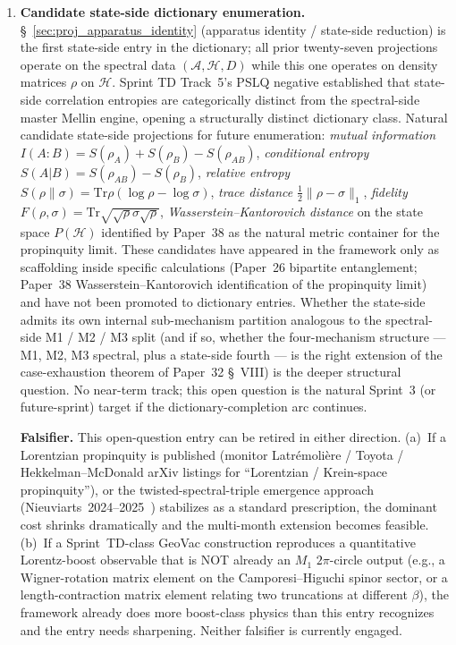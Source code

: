 \documentclass[11pt]{article}
\begin{document}
\begin{enumerate}
\item \textbf{Candidate state-side dictionary enumeration.}
\S~\ref{sec:proj_apparatus_identity} (apparatus identity / state-side
reduction) is the first state-side entry in the dictionary; all
prior twenty-seven projections operate on the spectral data
$(\mathcal{A}, \mathcal{H}, D)$ while this one operates on density
matrices $\rho$ on $\mathcal{H}$.  Sprint TD Track~5's PSLQ negative
established that state-side correlation entropies are categorically
distinct from the spectral-side master Mellin engine, opening a
structurally distinct dictionary class.  Natural candidate
state-side projections for future enumeration:
\emph{mutual information} $I(A{:}B) = S(\rho_A) + S(\rho_B) - S(\rho_{AB})$,
\emph{conditional entropy} $S(A|B) = S(\rho_{AB}) - S(\rho_B)$,
\emph{relative entropy} $S(\rho \| \sigma) = \mathrm{Tr}\rho(\log\rho
- \log\sigma)$,
\emph{trace distance} $\tfrac{1}{2}\|\rho - \sigma\|_1$,
\emph{fidelity} $F(\rho, \sigma) = \mathrm{Tr}\sqrt{\sqrt{\rho}\sigma\sqrt{\rho}}$,
\emph{Wasserstein--Kantorovich distance} on the state space
$P(\mathcal{H})$ identified by Paper~38 as the natural metric
container for the propinquity limit.  These candidates have appeared
in the framework only as scaffolding inside specific calculations
(Paper~26 bipartite entanglement; Paper~38 Wasserstein--Kantorovich
identification of the propinquity limit) and have not been promoted
to dictionary entries.  Whether the state-side admits its own
internal sub-mechanism partition analogous to the spectral-side M1 /
M2 / M3 split (and if so, whether the four-mechanism structure ---
M1, M2, M3 spectral, plus a state-side fourth --- is the right
extension of the case-exhaustion theorem of Paper~32 \S~VIII) is the
deeper structural question.  No near-term track; this open question
is the natural Sprint~3 (or future-sprint) target if the
dictionary-completion arc continues.

\textbf{Falsifier.}  This open-question entry can be retired in
either direction.  (a)~If a Lorentzian propinquity is published
(monitor Latr\'emoli\`ere / Toyota / Hekkelman--McDonald arXiv
listings for ``Lorentzian / Krein-space propinquity''), or the
twisted-spectral-triple emergence approach
(Nieuviarts~2024--2025~\cite{nieuviarts2025a,nieuviarts2025b})
stabilizes as a standard prescription, the dominant cost shrinks
dramatically and the multi-month extension becomes feasible.
(b)~If a Sprint~TD-class GeoVac construction reproduces a
quantitative Lorentz-boost observable that is NOT already an $M_1$
$2\pi$-circle output (e.g., a Wigner-rotation matrix element on the
Camporesi--Higuchi spinor sector, or a length-contraction
matrix element relating two truncations at different $\beta$), the
framework already does more boost-class physics than this entry
recognizes and the entry needs sharpening.  Neither falsifier is
currently engaged.


\end{enumerate}
\end{document}

